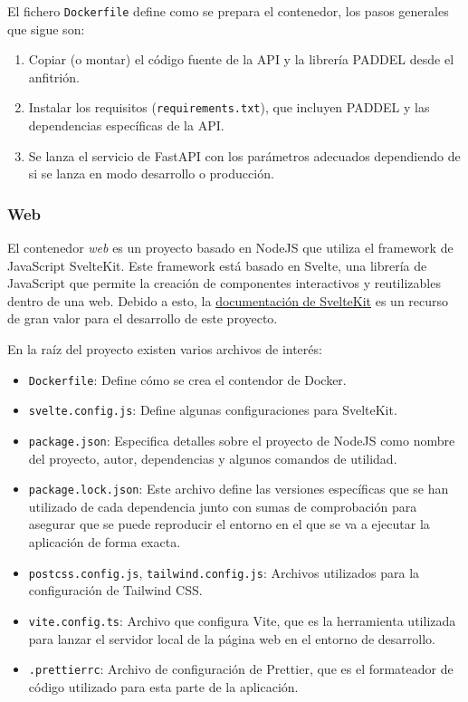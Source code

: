 El fichero \texttt{Dockerfile} define como se prepara el contenedor, los pasos
generales que sigue son:

\begin{enumerate}
    \item Copiar (o montar) el código fuente de la API y la librería PADDEL
          desde el anfitrión.
    \item Instalar los requisitos (\texttt{requirements.txt}), que incluyen
          PADDEL y las dependencias específicas de la API.
    \item Se lanza el servicio de FastAPI con los parámetros adecuados
          dependiendo de si se lanza en modo desarrollo o producción.
\end{enumerate}

\subsubsection{Web}

El contenedor \textit{web} es un proyecto basado en NodeJS que utiliza el
framework de JavaScript SvelteKit. Este framework está basado en Svelte, una
librería de JavaScript que permite la creación de componentes interactivos y
reutilizables dentro de una web. Debido a esto, la
\href{https://kit.svelte.dev/docs/introduction}{documentación de SvelteKit} es
un recurso de gran valor para el desarrollo de este proyecto.

En la raíz del proyecto existen varios archivos de interés:

\begin{itemize}
    \item \texttt{Dockerfile}: Define cómo se crea el contendor de Docker.
    \item \texttt{svelte.config.js}: Define algunas configuraciones para
    SvelteKit.
    \item \texttt{package.json}: Especifica detalles sobre el proyecto de NodeJS
          como nombre del proyecto, autor, dependencias y algunos comandos de
          utilidad.
    \item \texttt{package.lock.json}: Este archivo define las versiones
          específicas que se han utilizado de cada dependencia junto con sumas
          de comprobación para asegurar que se puede reproducir el entorno en el
          que se va a ejecutar la aplicación de forma exacta.
    \item \texttt{postcss.config.js}, \texttt{tailwind.config.js}: Archivos
          utilizados para la configuración de Tailwind CSS.
    \item \texttt{vite.config.ts}: Archivo que configura Vite, que es la
    herramienta utilizada para lanzar el servidor local de la página web en el
    entorno de desarrollo.
    \item \texttt{.prettierrc}: Archivo de configuración de Prettier, que es el
    formateador de código utilizado para esta parte de la aplicación.
\end{itemize}


